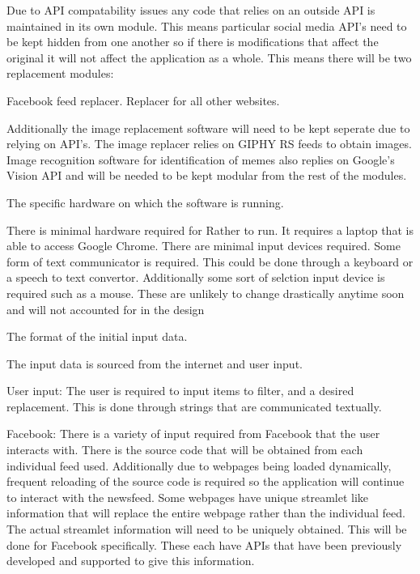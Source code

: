 \documentclass[12pt, titlepage]{article}
\newcounter{acnum}
\newcommand{\actheacnum}{AC\theacnum}
\begin{document}
Due to API compatability issues any code that relies on an outside API is maintained in its own module. This means particular social media API's need to be kept hidden from one another so if there is modifications that affect the original it will not affect the application as a whole. This means there will be two replacement modules:

Facebook feed replacer.
Replacer for all other websites.

Additionally the image replacement software will need to be kept seperate due to relying on API's. The image replacer relies on GIPHY RS feeds to obtain images. Image recognition software for identification of memes also replies on Google's Vision API and will be needed to be kept modular from the rest of the modules. 
\begin{description}
\item[ \actheacnum \label{acHardware}:] The specific
  hardware on which the software is running.

There is minimal hardware required for Rather to run. It requires a laptop that is able to access Google Chrome. There are minimal input devices required. Some form of text communicator is required. This could be done through a keyboard or a speech to text convertor. Additionally some sort of selction input device is required such as a mouse. These are unlikely to change drastically anytime soon and will not accounted for in the design 
\item[ \actheacnum \label{acInput}:] The format of the
  initial input data.
\item The input data is sourced from the internet and user input. 

User input:
The user is required to input items to filter, and a desired replacement. This is done through strings that are communicated textually.

Facebook: There is a variety of input required from Facebook that the user interacts with. There is the source code that will be obtained from each individual feed used. Additionally due to webpages being loaded dynamically, frequent reloading of the source code is required so the application will continue to interact with the newsfeed. Some webpages have unique streamlet like information that will replace the entire webpage rather than the individual feed. The actual streamlet information will need to be uniquely obtained. This will be done for Facebook specifically. These each have APIs that have been previously developed and supported to give this information.  
\end{description}
\end{document}
